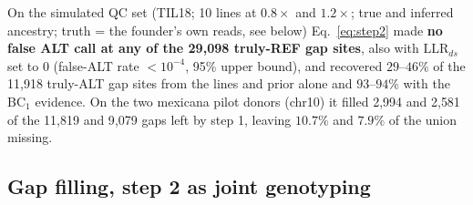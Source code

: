 \documentclass[11pt]{article}
\newcommand{\LLR}{\mathrm{LLR}}
\begin{document}
On the simulated QC set (TIL18; 10 lines at $0.8\times$ and $1.2\times$; true and inferred ancestry; truth = the founder's own reads, see
below) Eq.~\eqref{eq:step2} made \textbf{no false ALT call at any of the 29{,}098 truly-REF gap sites}, also with $\LLR_{ds}$ set to 0
(false-ALT rate $<10^{-4}$, 95\% upper bound), and recovered $29$--$46\%$ of the 11{,}918 truly-ALT gap sites from the lines and prior
alone and $93$--$94\%$ with the BC$_1$ evidence. On the two mexicana pilot donors (chr10) it filled 2{,}994 and 2{,}581 of the 11{,}819
and 9{,}079 gaps left by step 1, leaving $10.7\%$ and $7.9\%$ of the union missing.

\subsection{Gap filling, step 2 as joint genotyping}
\label{sec:joint}
\end{document}
